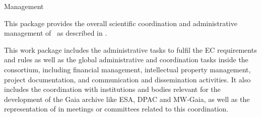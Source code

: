 
\begin{workpackage}{Management}
  \label{wp:management} %

  \wpend{\duration} %


  \makewptable %

  \begin{wpobjectives}
    This package provides the overall scientific coordination and administrative management of \acro\ as described in .
  \end{wpobjectives}

  \begin{wpdescription}

    This work package includes the administrative tasks to fulfil the EC requirements and rules as well as the global administrative and coordination tasks inside the consortium, including financial management, intellectual property management, project documentation, and communication and dissemination activities. It also includes the coordination with institutions and bodies relevant for the development of the Gaia archive like ESA, DPAC and MW-Gaia, as well as the representation of {\acro} in meetings or committees related to this coordination.


\end{wpdescription}
\end{workpackage}
